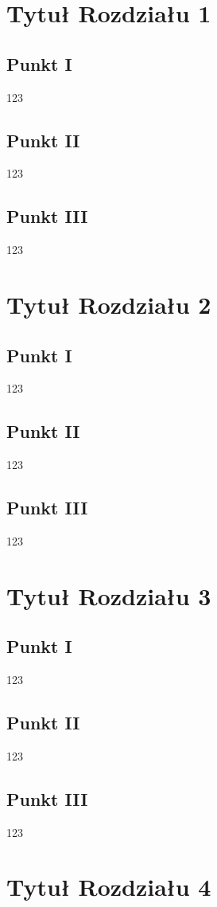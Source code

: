 


\clearpage
\tableofcontents
\clearpage

\newpage 
\chapter[1 tytuł w spisie]{Tytuł Rozdziału 1}
\section{Punkt I}
123
\section{Punkt II}
123
\section{Punkt III}
123
\newpage 
\chapter[2 tytuł w spisie]{Tytuł Rozdziału 2}
\section{Punkt I}
123
\section{Punkt II}
123
\section{Punkt III}
123
\newpage 
\chapter[3 tytuł w spisie]{Tytuł Rozdziału 3}
\section{Punkt I}
123
\section{Punkt II}
123
\section{Punkt III}
123
\newpage 
\chapter[4 tytuł w spisie]{Tytuł Rozdziału 4}
